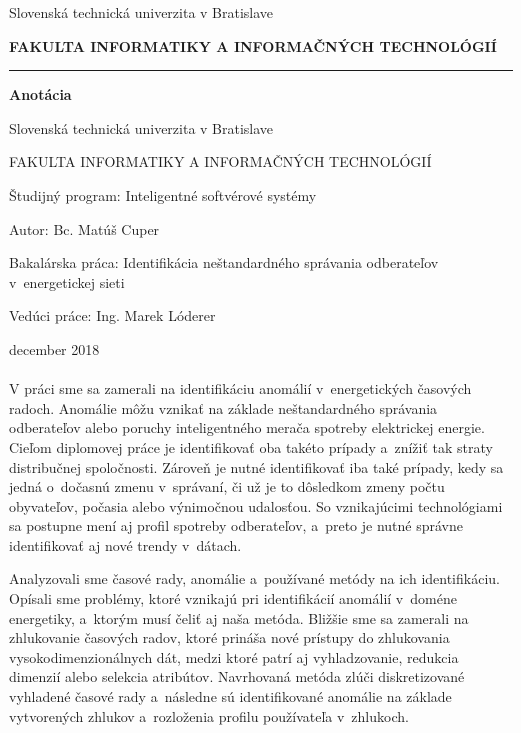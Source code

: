 \documentclass[a4paper,twoside,slovak,12pt,appendix]{article}
\begin{document}


\begin{titlepage}
\begin{center}
  {\small Slovenská technická univerzita v Bratislave \par}
  {\small \textbf{FAKULTA INFORMATIKY A INFORMAČNÝCH TECHNOLÓGIÍ}}
  \rule{\textwidth}{1pt}

  \vspace*{1.5cm}
  \begin{Large}
    \textbf{Anotácia} \par
  \end{Large}
\end{center}
{Slovenská technická univerzita v Bratislave \par}
{FAKULTA INFORMATIKY A INFORMAČNÝCH TECHNOLÓGIÍ \par}
{Študijný program: Inteligentné softvérové systémy \par}
{Autor: Bc. Matúš Cuper \par}
{Bakalárska práca: Identifikácia neštandardného správania odberateľov v~energetickej sieti \par}
{Vedúci práce: Ing. Marek Lóderer \par}
{december 2018 \\} \\
V práci sme sa zamerali na identifikáciu anomálií v~energetických časových
radoch. Anomálie môžu vznikať na základe neštandardného správania odberateľov
alebo poruchy inteligentného merača spotreby elektrickej energie. Cieľom
diplomovej práce je identifikovať oba takéto prípady a~znížiť tak straty
distribučnej spoločnosti. Zároveň je nutné identifikovať iba také prípady, kedy
sa jedná o~dočasnú zmenu v~správaní, či už je to dôsledkom zmeny počtu
obyvateľov, počasia alebo výnimočnou udalosťou. So vznikajúcimi technológiami
sa postupne mení aj profil spotreby odberateľov, a~preto je nutné správne
identifikovať aj nové trendy v~dátach.

Analyzovali sme časové rady, anomálie a~používané metódy na ich identifikáciu.
Opísali sme problémy, ktoré vznikajú pri identifikácií anomálií v~doméne
energetiky, a~ktorým musí čeliť aj naša metóda. Bližšie sme sa zamerali na
zhlukovanie časových radov, ktoré prináša nové prístupy do zhlukovania
vysokodimenzionálnych dát, medzi ktoré patrí aj vyhladzovanie, redukcia dimenzií
alebo selekcia atribútov. Navrhovaná metóda zlúči diskretizované vyhladené
časové rady a~následne sú identifikované anomálie na základe vytvorených zhlukov
a~rozloženia profilu používateľa v~zhlukoch.
\end{titlepage}
\end{document}
